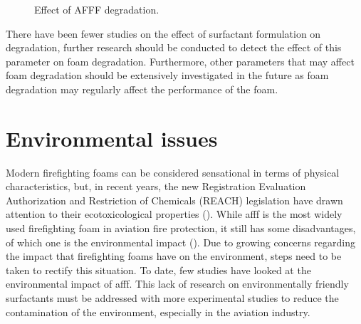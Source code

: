 \begin{figure}[H]

\centering
\begin{adjustbox}{center}
\end{adjustbox}

\caption{Effect of AFFF degradation.}
\label{ch2:figure:effect}
\end{figure}

There have been fewer studies on the effect of surfactant formulation on degradation, further research should be conducted to detect the effect of this parameter on foam degradation. Furthermore, other parameters that may affect foam degradation should be extensively investigated in the future as foam degradation may regularly affect the performance of the foam.

\section{Environmental issues}
Modern firefighting foams can be considered sensational in terms of physical characteristics, but, in recent years, the new Registration Evaluation Authorization and Restriction of Chemicals (REACH) legislation have drawn attention to their ecotoxicological properties (\cite{turekova2011environmental}). While \acrshort{afff} is the most widely used firefighting foam in aviation fire protection, it still has some disadvantages, of which one is the environmental impact (\cite{zhao2016improving}). Due to growing concerns regarding the impact that firefighting foams have on the environment, steps need to be taken to rectify this situation. To date, few studies have looked at the environmental impact of \acrshort{afff}. This lack of research on environmentally friendly surfactants must be addressed with more experimental studies to reduce the contamination of the environment, especially in the aviation industry. 

